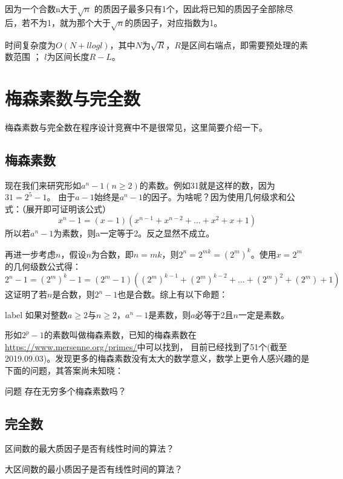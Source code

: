 因为一个合数n大于$\sqrt{n}$ 的质因子最多只有1个，因此将已知的质因子全部除尽后，若不为1，就为那个大于$\sqrt{n}$的质因子，对应指数为1。

时间复杂度为$O(N + llogl)$，其中$N$为$\sqrt{R}$，$R$是区间右端点，即需要预处理的素数范围 ； $l$为区间长度$R-L$。




\section{梅森素数与完全数}
梅森素数与完全数在程序设计竞赛中不是很常见，这里简要介绍一下。

\subsection{梅森素数}
现在我们来研究形如$a^n-1(n\ge2)$的素数。例如31就是这样的数，因为$31 = 2^5 - 1$。
由于$a-1$始终是$a^n-1$的因子。为啥呢？因为使用几何级求和公式：（展开即可证明该公式）
$$
x^n-1=(x-1)(x^{n-1}+x^{n-2}+...+x^2+x+1)
$$
所以若$a^n-1$为素数，则a一定等于2。反之显然不成立。

再进一步考虑$n$，假设$n$为合数，即$n=mk$，则$2^n=2^{mk}=(2^m)^k$。使用$x=2^m$的几何级数公式得：
$$
2^n - 1 = (2^m)^k - 1 = (2^m-1)((2^m)^{k-1}+(2^m)^{k-2}+...+(2^m)^2+(2^m)+1)
$$
这证明了若$n$是合数，则$2^n-1$也是合数。综上有以下命题：

\begin{proposition}{}{label}
	如果对整数$a\ge2$与$n\ge2$，$a^n-1$是素数，则$a$必等于2且$n$一定是素数。
\end{proposition}

形如$2^p-1$的素数叫做梅森素数，已知的梅森素数在\href{https://www.mersenne.org/primes/}{https://www.mersenne.org/primes/}中可以找到，
目前已经找到了51个(截至2019.09.03)。发现更多的梅森素数没有太大的数学意义，数学上更令人感兴趣的是下面的问题，其答案尚未知晓：

\begin{custom}{问题}
	存在无穷多个梅森素数吗？
\end{custom}

\subsection{完全数}


\vbox{}


\begin{problemset}
	\item 区间数的最大质因子是否有线性时间的算法？
	\item 大区间数的最小质因子是否有线性时间的算法？
\end{problemset}